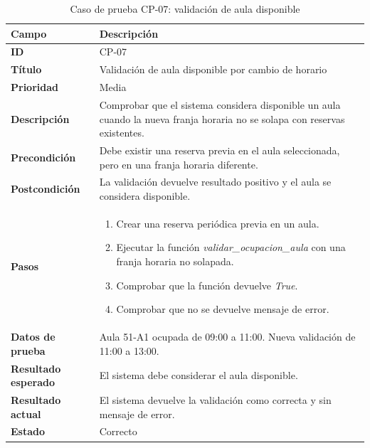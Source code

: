 \begin{table}[H]
	\centering
	\small
	\renewcommand{\arraystretch}{1.2}
	\begin{tabularx}{\textwidth}{@{}p{3.5cm}X@{}}
		\toprule
		\textbf{Campo} & \textbf{Descripción} \\
		\midrule
		\textbf{ID} & CP-07 \\
		\textbf{Título} & Validación de aula disponible por cambio de horario \\
		\textbf{Prioridad} & Media \\
		\textbf{Descripción} & Comprobar que el sistema considera disponible un aula cuando la nueva franja horaria no se solapa con reservas existentes. \\
		\textbf{Precondición} & Debe existir una reserva previa en el aula seleccionada, pero en una franja horaria diferente. \\
		\textbf{Postcondición} & La validación devuelve resultado positivo y el aula se considera disponible. \\
		\textbf{Pasos} &
		\begin{enumerate}
			\item Crear una reserva periódica previa en un aula.
			\item Ejecutar la función \textit{validar\_ocupacion\_aula} con una franja horaria no solapada.
			\item Comprobar que la función devuelve \textit{True}.
			\item Comprobar que no se devuelve mensaje de error.
		\end{enumerate} \\
		\textbf{Datos de prueba} & Aula 51-A1 ocupada de 09:00 a 11:00. Nueva validación de 11:00 a 13:00. \\
		\textbf{Resultado esperado} & El sistema debe considerar el aula disponible. \\
		\textbf{Resultado actual} & El sistema devuelve la validación como correcta y sin mensaje de error. \\
		\textbf{Estado} & Correcto \\
		\bottomrule
	\end{tabularx}
	\caption{Caso de prueba CP-07: validación de aula disponible}
	\label{tab}
\end{table}

